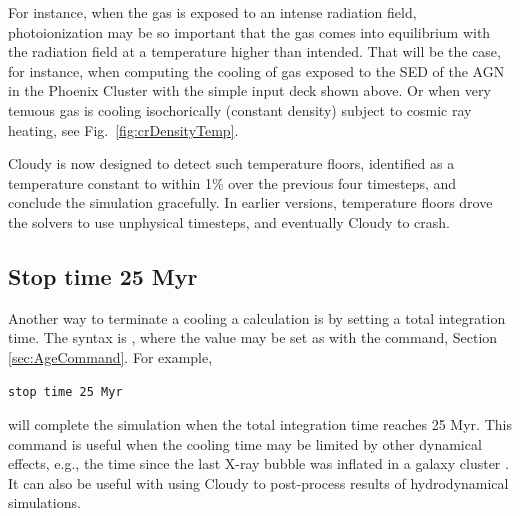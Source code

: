For instance, when the gas is exposed to an intense radiation field,
photoionization may be so important that the gas comes into equilibrium with
the radiation field at a temperature higher than intended. 
That will be the case, for instance, when computing the cooling of gas exposed
to the SED of the AGN in the Phoenix Cluster \citep{Reefe2025} with the simple
input deck shown above.
Or when very tenuous gas is cooling isochorically (constant density) subject to
cosmic ray heating, see Fig.~\ref{fig:crDensityTemp}.

Cloudy is now designed to detect such temperature floors, identified as a
temperature constant to within 1\% over the previous four timesteps, and
conclude the simulation gracefully.
In earlier versions, temperature floors drove the solvers to use unphysical
timesteps, and eventually Cloudy to crash.


\subsection{Stop time 25 Myr}
\label{sec:StopTimeValue}

Another way to terminate a cooling a calculation is by setting a total
integration time.
The syntax is , where the value may be set as
with the  command, Section \ref{sec:AgeCommand}.
For example,
%
\begin{verbatim}
stop time 25 Myr
\end{verbatim}
%
will complete the simulation when the total integration time reaches 25 Myr.
This command is useful when the cooling time may be limited by other dynamical
effects, e.g., the time since the last X-ray bubble was inflated in a galaxy
cluster \citep[e.g.,][]{Reefe2025}.
It can also be useful with using Cloudy to post-process results of
hydrodynamical simulations.


